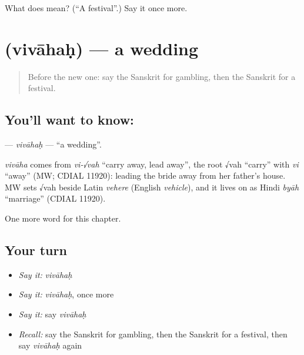 \begin{tcolorbox}[breakable,colback=teal!4,colframe=teal!35!black,title={Before you move on}]
What does  mean? (\textquotedblleft{}A festival\textquotedblright{}.) Say it once more.
\end{tcolorbox}
\section[\texorpdfstring{\sk{विवाहः} (vivāhaḥ)}{विवाहः (vivāhaḥ)}]{ (vivāhaḥ) — a wedding}

\label{lesson:SA-C163-vivahah}



\begin{quote}
Before the new one: say the Sanskrit for gambling, then the Sanskrit for a festival.
\end{quote}

\subsection*{You'll want to know: }
\textbf{} — \emph{vivāhaḥ} — \textquotedblleft{}a wedding\textquotedblright{}.

\begin{cousinweb}
\emph{vivāha} comes from \emph{vi-√vah} \textquotedblleft{}carry away, lead away\textquotedblright{}, the root √vah \textquotedblleft{}carry\textquotedblright{} with \emph{vi} \textquotedblleft{}away\textquotedblright{} (MW; CDIAL 11920): leading the bride away from her father's house. MW sets √vah beside Latin \emph{vehere} (English \emph{vehicle}), and it lives on as Hindi \emph{byāh} \textquotedblleft{}marriage\textquotedblright{} (CDIAL 11920).
\end{cousinweb}

\begin{grammarlens}[title={What you've built}]
One more word for this chapter.
\end{grammarlens}

\subsection*{Your turn}
\begin{itemize}
\raggedright
  \item \emph{Say it:} \emph{vivāhaḥ}
  \item \emph{Say it:} \emph{vivāhaḥ}, once more
  \item \emph{Say it:} say \emph{vivāhaḥ}
  \item \emph{Recall:} say the Sanskrit for gambling, then the Sanskrit for a festival, then say \emph{vivāhaḥ} again
\end{itemize}

